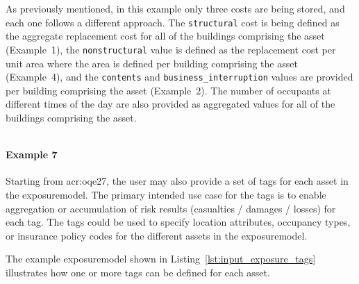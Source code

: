 As previously mentioned, in this example only three costs are being stored,
and each one follows a different approach. The \Verb+structural+ cost is being
defined as the aggregate replacement cost for all of the buildings comprising
the asset (Example~1), the \Verb+nonstructural+ value is defined as the
replacement cost per unit area where the area is defined per building
comprising the \gls{asset} (Example~4), and the \Verb+contents+ and
\Verb+business_interruption+ values are provided per building comprising the
\gls{asset} (Example~2). The number of occupants at different times of the day are
also provided as aggregated values for all of the buildings comprising the
\gls{asset}.

\begin{listing}[htbp]
  \inputminted[firstline=1,firstnumber=1,fontsize=\footnotesize,frame=single,linenos,bgcolor=lightgray]{xml}{oqum/risk/verbatim/input_exposure_occupants.xml}
  \caption{Example exposure model specifying the aggregate number of occupants per asset (\href{https://raw.githubusercontent.com/gem/oq-engine/master/doc/manual/oqum/risk/verbatim/input_exposure_occupants.xml}{Download example})}
  \label{lst:input_exposure_occupants}
\end{listing}


\paragraph{Example 7}

Starting from \glsdesc{acr:oqe27}, the user may also provide a set of \glspl{tag} 
for each \gls{asset} in the \gls{exposuremodel}. The primary intended use case for the 
\glspl{tag} is to enable aggregation or accumulation of risk results (casualties /
damages / losses) for each \gls{tag}. The \glspl{tag} could be used to specify
location attributes, occupancy types, or insurance policy codes for the 
different \glspl{asset} in the \gls{exposuremodel}.

The example
\gls{exposuremodel} shown in Listing~\ref{lst:input_exposure_tags} illustrates
how one or more \glspl{tag} can be defined for each \gls{asset}.

\begin{listing}[htbp]
  \inputminted[firstline=1,firstnumber=1,fontsize=\footnotesize,frame=single,linenos,bgcolor=lightgray]{xml}{oqum/risk/verbatim/input_exposure_tags.xml}
  \caption{Example exposure model specifying six location based tags for each asset (\href{https://raw.githubusercontent.com/gem/oq-engine/master/doc/manual/oqum/risk/verbatim/input_exposure_tags.xml}{Download example})}
  \label{lst:input_exposure_tags}
\end{listing}

